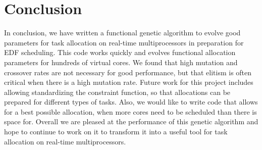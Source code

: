 \documentclass[11pt]{article}
\begin{document}
\section{Conclusion}

In conclusion, we have written a functional genetic algorithm to evolve good parameters for task allocation on real-time multiprocessors in preparation for EDF scheduling. This code works quickly and evolves functional allocation parameters for hundreds of virtual cores. We found that high mutation and crossover rates are not necessary for good performance, but that elitism is often critical when there is a high mutation rate. Future work for this project includes allowing standardizing the constraint function, so that allocations can be prepared for different types of tasks. Also, we would like to write code that allows for a best possible allocation, when more cores need to be scheduled than there is space for. Overall we are pleased at the performance of this genetic algorithm and hope to continue to work on it to transform it into a useful tool for task allocation on real-time multiprocessors.

\singlespacing


\end{document}
